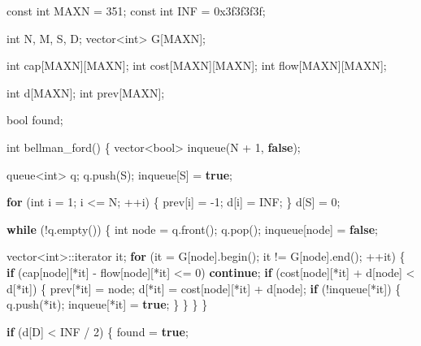 \documentclass[10pt,]{article}
\newenvironment{Shaded}{}{}
\newcommand{\KeywordTok}[1]{\textcolor[rgb]{0.00,0.44,0.13}{\textbf{{#1}}}}
\newcommand{\DataTypeTok}[1]{\textcolor[rgb]{0.56,0.13,0.00}{{#1}}}
\newcommand{\DecValTok}[1]{\textcolor[rgb]{0.25,0.63,0.44}{{#1}}}
\newcommand{\BaseNTok}[1]{\textcolor[rgb]{0.25,0.63,0.44}{{#1}}}
\newcommand{\NormalTok}[1]{{#1}}
\begin{document}
\begin{Shaded}
\begin{Highlighting}[]
\DataTypeTok{const} \DataTypeTok{int} \NormalTok{MAXN = }\DecValTok{351}\NormalTok{;}
\DataTypeTok{const} \DataTypeTok{int} \NormalTok{INF = }\BaseNTok{0x3f3f3f3f}\NormalTok{;}

\DataTypeTok{int} \NormalTok{N, M, S, D;}
\NormalTok{vector<}\DataTypeTok{int}\NormalTok{> G[MAXN];}

\DataTypeTok{int} \NormalTok{cap[MAXN][MAXN];}
\DataTypeTok{int} \NormalTok{cost[MAXN][MAXN];}
\DataTypeTok{int} \NormalTok{flow[MAXN][MAXN];}

\DataTypeTok{int} \NormalTok{d[MAXN];}
\DataTypeTok{int} \NormalTok{prev[MAXN];}

\DataTypeTok{bool} \NormalTok{found;}

\DataTypeTok{int} \NormalTok{bellman_ford()}
\NormalTok{\{}
  \NormalTok{vector<}\DataTypeTok{bool}\NormalTok{> inqueue(N + }\DecValTok{1}\NormalTok{, }\KeywordTok{false}\NormalTok{);}

  \NormalTok{queue<}\DataTypeTok{int}\NormalTok{> q;}
  \NormalTok{q.push(S);}
  \NormalTok{inqueue[S] = }\KeywordTok{true}\NormalTok{;}

  \KeywordTok{for} \NormalTok{(}\DataTypeTok{int} \NormalTok{i = }\DecValTok{1}\NormalTok{; i <= N; ++i) \{}
    \NormalTok{prev[i] = -}\DecValTok{1}\NormalTok{;}
    \NormalTok{d[i] = INF;}
  \NormalTok{\}}
  \NormalTok{d[S] = }\DecValTok{0}\NormalTok{;}

  \KeywordTok{while} \NormalTok{(!q.empty()) \{}
    \DataTypeTok{int} \NormalTok{node = q.front();}
    \NormalTok{q.pop();}
    \NormalTok{inqueue[node] = }\KeywordTok{false}\NormalTok{;}

    \NormalTok{vector<}\DataTypeTok{int}\NormalTok{>::iterator it;}
    \KeywordTok{for} \NormalTok{(it = G[node].begin(); it != G[node].end(); ++it) \{}
      \KeywordTok{if} \NormalTok{(cap[node][*it] - flow[node][*it] <= }\DecValTok{0}\NormalTok{)}
        \KeywordTok{continue}\NormalTok{;}
      \KeywordTok{if} \NormalTok{(cost[node][*it] + d[node] < d[*it]) \{}
        \NormalTok{prev[*it] = node;}
        \NormalTok{d[*it] = cost[node][*it] + d[node];}
        \KeywordTok{if} \NormalTok{(!inqueue[*it]) \{}
          \NormalTok{q.push(*it);}
          \NormalTok{inqueue[*it] = }\KeywordTok{true}\NormalTok{;}
        \NormalTok{\}}
      \NormalTok{\}}
    \NormalTok{\}}
  \NormalTok{\}}

  \KeywordTok{if} \NormalTok{(d[D] < INF / }\DecValTok{2}\NormalTok{) \{}
    \NormalTok{found = }\KeywordTok{true}\NormalTok{;}


\end{Highlighting}
\end{Shaded}
\end{document}

